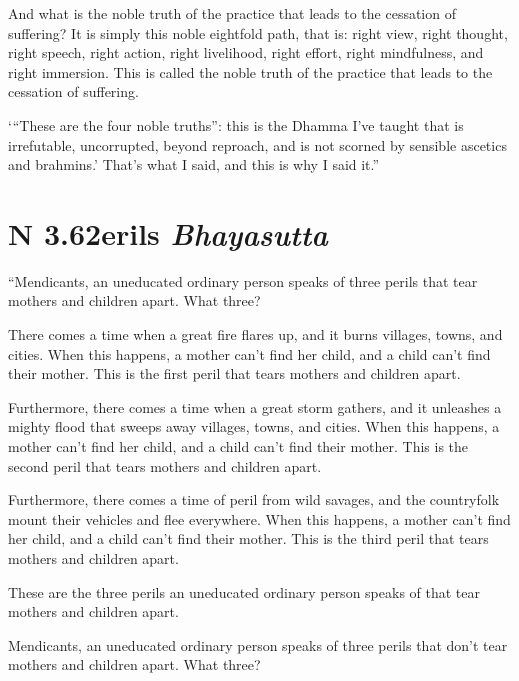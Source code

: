 \documentclass[12pt,openany]{book}%
\newcommand*{\suttatitleacronym}[1]{\smaller[2]{#1}\vspace*{.3em}}
\newcommand*{\suttatitletranslation}[1]{\linebreak{#1}}
\newcommand*{\suttatitleroot}[1]{\linebreak\smaller[2]\itshape{#1}}
\newcommand*{\tocacronym}[1]{\hspace*{-3.3em}{#1}\quad}
\newcommand*{\toctranslation}[1]{#1}
\newcommand*{\tocroot}[1]{(\textit{#1})}
\begin{document}
And what is the noble truth of the practice that leads to the cessation of suffering? It is simply this noble eightfold path, that is: right view, right thought, right speech, right action, right livelihood, right effort, right mindfulness, and right immersion. This is called the noble truth of the practice that leads to the cessation of suffering. 

‘“These are the four noble truths”: this is the Dhamma I’ve taught that is irrefutable, uncorrupted, beyond reproach, and is not scorned by sensible ascetics and brahmins.’ That’s what I said, and this is why I said it.” 

%
\section*{{\suttatitleacronym AN 3.62}{\suttatitletranslation Perils }{\suttatitleroot Bhayasutta}}
\addcontentsline{toc}{section}{\tocacronym{AN 3.62} \toctranslation{Perils } \tocroot{Bhayasutta}}

“Mendicants, an uneducated ordinary person speaks of three perils that tear mothers and children apart. What three? 

There comes a time when a great fire flares up, and it burns villages, towns, and cities. When this happens, a mother can’t find her child, and a child can’t find their mother. This is the first peril that tears mothers and children apart. 

Furthermore, there comes a time when a great storm gathers, and it unleashes a mighty flood that sweeps away villages, towns, and cities. When this happens, a mother can’t find her child, and a child can’t find their mother. This is the second peril that tears mothers and children apart. 

Furthermore, there comes a time of peril from wild savages, and the countryfolk mount their vehicles and flee everywhere. When this happens, a mother can’t find her child, and a child can’t find their mother. This is the third peril that tears mothers and children apart. 

These are the three perils an uneducated ordinary person speaks of that tear mothers and children apart. 

Mendicants, an uneducated ordinary person speaks of three perils that don’t tear mothers and children apart. What three? 
\end{document}
